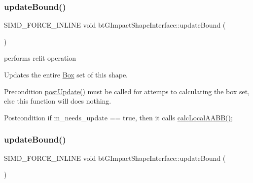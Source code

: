 \mbox{\label{classbtGImpactShapeInterface_acb26c2d7a2aecabd06b996b72b848492}} 
\subsubsection{\texorpdfstring{update\+Bound()}{updateBound()}\hspace{0.1cm}{\footnotesize\ttfamily [1/2]}}
{\footnotesize\ttfamily S\+I\+M\+D\+\_\+\+F\+O\+R\+C\+E\+\_\+\+I\+N\+L\+I\+NE void bt\+G\+Impact\+Shape\+Interface\+::update\+Bound (\begin{DoxyParamCaption}{ }\end{DoxyParamCaption})\hspace{0.3cm}{\ttfamily [inline]}}



performs refit operation 

Updates the entire \hyperlink{classBox}{Box} set of this shape. \begin{DoxyPrecond}{Precondition}
\hyperlink{classbtGImpactShapeInterface_ac430754948ac92d6f70b81e88416c96a}{post\+Update()} must be called for attemps to calculating the box set, else this function will does nothing. 
\end{DoxyPrecond}
\begin{DoxyPostcond}{Postcondition}
if m\+\_\+needs\+\_\+update == true, then it calls \hyperlink{classbtGImpactShapeInterface_a1712a4613e20aa9249514dcd97f0a086}{calc\+Local\+A\+A\+B\+B()}; 
\end{DoxyPostcond}
\mbox{\label{classbtGImpactShapeInterface_acb26c2d7a2aecabd06b996b72b848492}} 
\subsubsection{\texorpdfstring{update\+Bound()}{updateBound()}\hspace{0.1cm}{\footnotesize\ttfamily [2/2]}}
{\footnotesize\ttfamily S\+I\+M\+D\+\_\+\+F\+O\+R\+C\+E\+\_\+\+I\+N\+L\+I\+NE void bt\+G\+Impact\+Shape\+Interface\+::update\+Bound (\begin{DoxyParamCaption}{ }\end{DoxyParamCaption})\hspace{0.3cm}{\ttfamily [inline]}}



